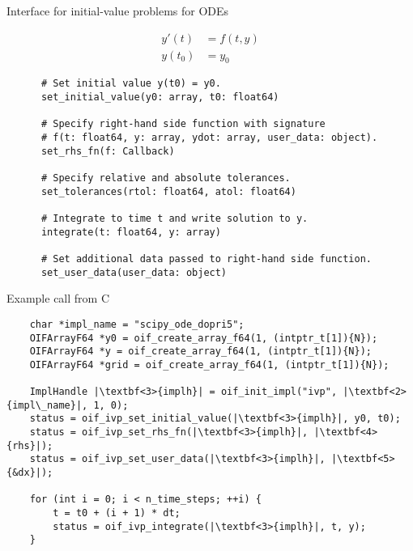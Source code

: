 \documentclass[10pt, aspectratio=169, progressbar=frametitle]{beamer}
\begin{document}
\begin{frame}[fragile]{Interface for initial-value problems for ODEs}
  \begin{minipage}{\dimexpr0.22\textwidth-2\tabcolsep}
    \begin{align*}
      y'(t)  & = f(t, y) \\
      y(t_0) & = y_0
    \end{align*}
  \end{minipage}
  \begin{minipage}{\dimexpr0.73\textwidth-2\tabcolsep}
    \begin{verbatim}
      # Set initial value y(t0) = y0.
      set_initial_value(y0: array, t0: float64)

      # Specify right-hand side function with signature
      # f(t: float64, y: array, ydot: array, user_data: object).
      set_rhs_fn(f: Callback)

      # Specify relative and absolute tolerances.
      set_tolerances(rtol: float64, atol: float64)

      # Integrate to time t and write solution to y.
      integrate(t: float64, y: array)

      # Set additional data passed to right-hand side function.
      set_user_data(user_data: object)
    \end{verbatim}
  \end{minipage}
\end{frame}

\begin{frame}[fragile]{Example call from C}
  \begin{verbatim}
    char *impl_name = "scipy_ode_dopri5";
    OIFArrayF64 *y0 = oif_create_array_f64(1, (intptr_t[1]){N});
    OIFArrayF64 *y = oif_create_array_f64(1, (intptr_t[1]){N});
    OIFArrayF64 *grid = oif_create_array_f64(1, (intptr_t[1]){N});

    ImplHandle |\textbf<3>{implh}| = oif_init_impl("ivp", |\textbf<2>{impl\_name}|, 1, 0);
    status = oif_ivp_set_initial_value(|\textbf<3>{implh}|, y0, t0);
    status = oif_ivp_set_rhs_fn(|\textbf<3>{implh}|, |\textbf<4>{rhs}|);
    status = oif_ivp_set_user_data(|\textbf<3>{implh}|, |\textbf<5>{&dx}|);

    for (int i = 0; i < n_time_steps; ++i) {
        t = t0 + (i + 1) * dt;
        status = oif_ivp_integrate(|\textbf<3>{implh}|, t, y);
    }
  \end{verbatim}
\end{frame}
\end{document}
